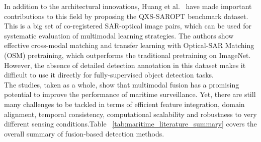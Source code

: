 In addition to the architectural innovations, Huang et al.~\cite{huang2021qxssaroptdatasetdeeplearning} have made important contributions to this field by proposing the QXS-SAROPT benchmark dataset. This is a big set of co-registered SAR-optical image pairs, which can be used for systematic evaluation of multimodal learning strategies. The authors show effective cross-modal matching and transfer learning with Optical-SAR Matching (OSM) pretraining, which outperforms the traditional pretraining on ImageNet. However, the absence of detailed detection annotation in this dataset makes it difficult to use it directly for fully-supervised object detection tasks.\\

The studies, taken as a whole, show that multimodal fusion has a promising potential to improve the performance of maritime surveillance. Yet, there are still many challenges to be tackled in terms of efficient feature integration, domain alignment, temporal consistency, computational scalability and robustness to very different sensing conditions.Table ~\ref{tab:maritime_literature_summary} covers the overall summary of
fusion-based detection methods.\\

